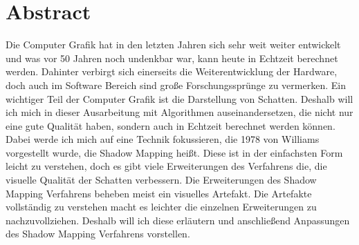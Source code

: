 \documentclass{thesisclass}
\let\cleardoublepage\clearpage
\begin{document}

\frontmatter
{}

\blankpage

\chapter*{Abstract}
Die Computer Grafik hat in den letzten Jahren sich sehr weit weiter entwickelt und was 
vor 50 Jahren noch undenkbar war, kann heute in Echtzeit berechnet werden.
Dahinter verbirgt sich einerseits die Weiterentwicklung der Hardware, doch auch im Software 
Bereich sind große Forschungssprünge zu vermerken.
Ein wichtiger Teil der Computer Grafik ist die Darstellung von Schatten.
Deshalb will ich mich in dieser Ausarbeitung mit Algorithmen auseinandersetzen,
die nicht nur eine gute Qualität haben, sondern auch in Echtzeit berechnet werden können.
Dabei werde ich mich auf eine Technik fokussieren, die 1978 von Williams vorgestellt wurde, die \glqq{}Shadow Mapping\grqq{} heißt.
Diese ist in der einfachsten Form leicht zu verstehen, doch es gibt viele 
Erweiterungen des Verfahrens die, die visuelle Qualität 
der Schatten verbessern. Die Erweiterungen des \glqq{}Shadow Mapping\grqq{} Verfahrens 
beheben meist ein visuelles Artefakt.
Die Artefakte vollständig zu verstehen macht es leichter die einzelnen Erweiterungen zu nachzuvollziehen.
Deshalb will ich diese erläutern und anschließend Anpassungen des Shadow Mapping Verfahrens vorstellen.


\tableofcontents
\blankpage

\mainmatter
{}




\cleardoublepage
{}
{}

{}	%
{}	%
												  



\end{document}
